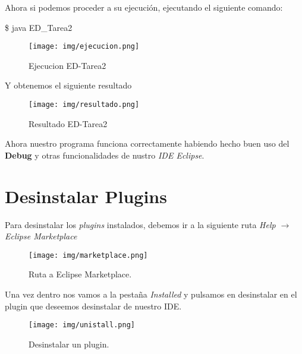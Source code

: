 \documentclass{article}
\begin{document}
      Ahora si podemos proceder a su ejecución, ejecutando el siguiente comando:
      \begin{listing}[style=consola, numbers=none]
        \$ java ED_Tarea2
      \end{listing}

  \newpage
      \begin{figure}[h]
        \centering
        \texttt{[image: img/ejecucion.png]}
        \caption{Ejecucion ED-Tarea2}
      \end{figure}
      Y obtenemos el siguiente resultado
      \begin{figure}[h]
        \centering
        \texttt{[image: img/resultado.png]}
        \caption{Resultado ED-Tarea2}
      \end{figure}
      
      Ahora nuestro programa funciona correctamente habiendo hecho buen uso del \textbf{Debug} y otras funcionalidades de nustro \textit{IDE Eclipse}.
    
  \newpage
    \section{Desinstalar Plugins}
      Para desinstalar los \textit{plugins} instalados, debemos ir a la siguiente ruta \textit{Help $\rightarrow$ Eclipse Marketplace}
      \begin{figure}[h]
        \centering
        \texttt{[image: img/marketplace.png]}
        \caption{Ruta a Eclipse Marketplace.}
      \end{figure}
      Una vez dentro nos vamos a la pestaña \textit{Installed} y pulsamos en desinstalar en el plugin que deseemos desinstalar de nuestro IDE.
      \begin{figure}[h]
        \centering
        \texttt{[image: img/unistall.png]}
        \caption{Desinstalar un plugin.}
      \end{figure}

  \newpage
\end{document}
